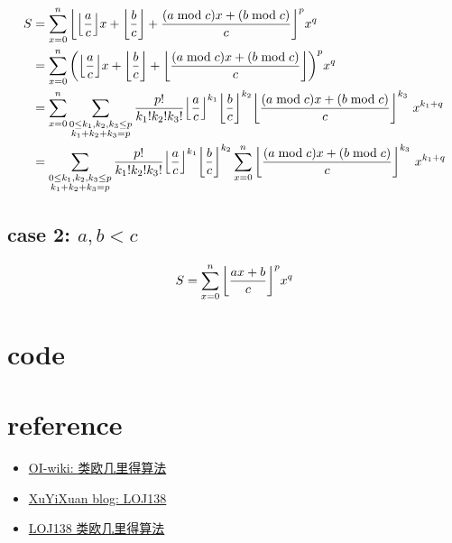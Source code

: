 \documentclass{article}
\begin{document}
\[
	\begin{aligned}
		S
		&=\sum_{x=0}^n { \left\lfloor { \left\lfloor \frac{a}{c} \right\rfloor } x+{ \left\lfloor \frac{b}{c} \right\rfloor }+\frac{(a\bmod c)x+(b\bmod c)}{c} \right\rfloor }^p x^q\\
		&=\sum_{x=0}^n
			{\left(
				{ \left\lfloor \frac{a}{c} \right\rfloor }x + { \left\lfloor \frac{b}{c} \right\rfloor } + { \left\lfloor \frac{(a\bmod c)x+(b\bmod c)}{c} \right\rfloor }
			\right)}^p x^q\\
		&=\sum_{x=0}^n
				\sum_{\begin{subarray}{c}0\leq k_1,k_2,k_3\leq p\\ k_1+k_2+k_3=p\end{subarray}}
					\frac{p!}{k_1!k_2!k_3!}
					{ \left\lfloor \frac{a}{c} \right\rfloor }^{k_1}
					{ \left\lfloor \frac{b}{c} \right\rfloor }^{k_2}
					{ \left\lfloor \frac{(a\bmod c)x+(b\bmod c)}{c} \right\rfloor }^{k_3}
					\ x^{k_1 + q}\\
		&=\sum_{\begin{subarray}{c}0\leq k_1,k_2,k_3\leq p\\ k_1+k_2+k_3=p\end{subarray}}
				\frac{p!}{k_1!k_2!k_3!}
				{ \left\lfloor \frac{a}{c} \right\rfloor }^{k_1}
				{ \left\lfloor \frac{b}{c} \right\rfloor }^{k_2}
				\sum_{x=0}^n
					{ \left\lfloor \frac{(a\bmod c)x+(b\bmod c)}{c} \right\rfloor }^{k_3}
					\ x^{k_1 + q}\\
	\end{aligned}
\]

\subsection*{case 2: $a,b < c$}

\[
	\begin{aligned}
		S
		&=\sum_{x=0}^n { \left\lfloor \frac{ax+b}{c} \right\rfloor }^p x^q\\
	\end{aligned}
\]

\newpage
\appendix

\section{code}

\section{reference}

\begin{itemize}
	\item \href{https://oi-wiki.org/math/euclidean/}{OI-wiki: 类欧几里得算法}
	\item \href{https://blog.csdn.net/qq_39972971/article/details/94618394}{XuYiXuan blog: LOJ138}
	\item \href{https://loj.ac/p/138}{LOJ138 类欧几里得算法}
\end{itemize}
\end{document}
